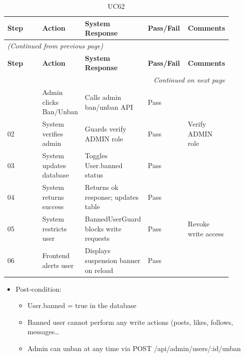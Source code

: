 \begin{longtable}{|p{0.18\linewidth}|p{0.18\linewidth}|p{0.18\linewidth}|p{0.18\linewidth}|p{0.18\linewidth}|}
\caption{UC62} \label{tab:43} \\
\hline
\textbf{Step} & \textbf{Action} & \textbf{System Response} & \textbf{Pass/Fail} & \textbf{Comments} \\
\hline
\endfirsthead
\multicolumn{5}{l}{\textit{(Continued from previous page)}} \\
\hline
\textbf{Step} & \textbf{Action} & \textbf{System Response} & \textbf{Pass/Fail} & \textbf{Comments} \\
\hline
\endhead
\hline \multicolumn{5}{r}{\textit{Continued on next page}} \\
\endfoot
\hline
\endlastfoot
01 & Admin clicks Ban/Unban & Calls admin ban/unban API & Pass &  \\
\hline
02 & System verifies admin & Guards verify ADMIN role & Pass & Verify ADMIN role \\
\hline
03 & System updates database & Toggles User.banned status & Pass &  \\
\hline
04 & System returns success & Returns ok response; updates table & Pass &  \\
\hline
05 & System restricts user & BannedUserGuard blocks write requests & Pass & Revoke write access \\
\hline
06 & Frontend alerts user & Displays suspension banner on reload & Pass &  \\
\hline
\end{longtable}

\begin{itemize}
  \item Post-condition:
\begin{itemize}
  \item User.banned = true in the database
  \item Banned user cannot perform any write actions (posts, likes, follows, messages{\ldots}
  \item Admin can unban at any time via POST /api/admin/users/:id/unban
\end{itemize}
\end{itemize}

